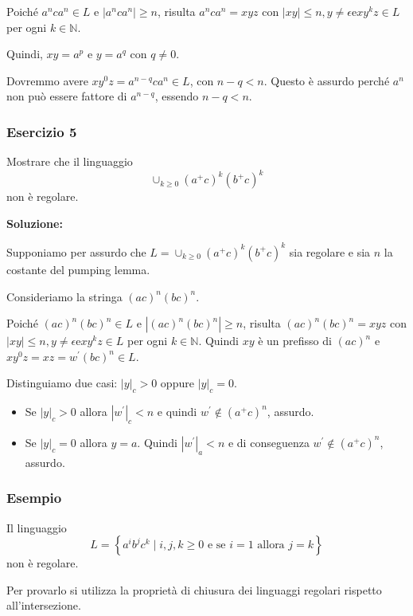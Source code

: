 Poiché $a^{n} c a^{n} \in L$ e $\left|a^{n} c a^{n}\right| \geq n$, risulta $a^{n} c a^{n}=x y z$ con $|x y| \leq n, y \neq \epsilon \mathrm{e} x y^{k} z \in L$ per ogni $k \in \mathbb{N}$.

Quindi, $x y=a^{p}$ e $y=a^{q}$ con $q \neq 0$.

Dovremmo avere $x y^{0} z=a^{n-q} c a^{n} \in L$, con $n-q<n .$ Questo è assurdo perché $a^{n}$ non può essere fattore di $a^{n-q}$, essendo $n-q<n .$

\subsubsection{Esercizio 5}
Mostrare che il linguaggio
$$
\cup_{k \geq 0}\left(a^{+} c\right)^{k}\left(b^{+} c\right)^{k}
$$
non è regolare.

\vspace{5mm}

\textbf{Soluzione:}

Supponiamo per assurdo che $L=\cup_{k \geq 0}\left(a^{+} c\right)^{k}\left(b^{+} c\right)^{k}$ sia regolare e sia $n$ la costante del pumping lemma.

Consideriamo la stringa $(a c)^{n}(b c)^{n}$.

Poiché $(a c)^{n}(b c)^{n} \in L$ e $\left|(a c)^{n}(b c)^{n}\right| \geq n$, risulta $(a c)^{n}(b c)^{n}=x y z$ con $|x y| \leq n, y \neq \epsilon \mathrm{e} x y^{k} z \in L$ per ogni $k \in \mathbb{N}$.
Quindi $x y$ è un prefisso di $(a c)^{n}$ e $x y^{0} z=x z=w^{\prime}(b c)^{n} \in L$.

Distinguiamo due casi: $|y|_{c}>0$ oppure $|y|_{c}=0$.
\begin{itemize}
    \item Se $|y|_{c}>0$ allora $\left|w^{\prime}\right|_{c}<n$ e quindi $w^{\prime} \notin\left(a^{+} c\right)^{n}$, assurdo.
    \item Se $|y|_{c}=0$ allora $y=a$. Quindi $\left|w^{\prime}\right|_{a}<n$ e di conseguenza $w^{\prime} \notin\left(a^{+} c\right)^{n}$, assurdo.
\end{itemize}

\subsubsection{Esempio}

Il linguaggio
$$
L=\left\{a^{i} b^{j} c^{k} \mid i, j, k \geq 0 \text { e se } i=1 \text { allora } j=k\right\}
$$
non è regolare.

Per provarlo si utilizza la proprietà di chiusura dei linguaggi regolari rispetto all'intersezione.


